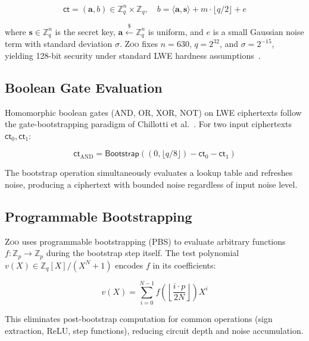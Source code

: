 \documentclass[11pt,letterpaper]{article}
\theoremstyle{definition}
\theoremstyle{remark}
\newcommand{\Zoo}{\textsc{Zoo}}
\newcommand{\LWE}{\textsc{LWE}}
\begin{document}
\begin{equation}
  \mathsf{ct} = (\mathbf{a}, b) \in \mathbb{Z}_q^n \times \mathbb{Z}_q, \quad b = \langle \mathbf{a}, \mathbf{s} \rangle + m \cdot \lfloor q/2 \rfloor + e
\end{equation}

\noindent where $\mathbf{s} \in \mathbb{Z}_q^n$ is the secret key, $\mathbf{a} \xleftarrow{\$} \mathbb{Z}_q^n$ is uniform, and $e$ is a small Gaussian noise term with standard deviation $\sigma$. \Zoo{} fixes $n = 630$, $q = 2^{32}$, and $\sigma = 2^{-15}$, yielding 128-bit security under standard \LWE{} hardness assumptions~\cite{albrecht2015lwe}.

\subsection{Boolean Gate Evaluation}

Homomorphic boolean gates (AND, OR, XOR, NOT) on \LWE{} ciphertexts follow the gate-bootstrapping paradigm of Chillotti et al.~\cite{chillotti2020tfhe}. For two input ciphertexts $\mathsf{ct}_0, \mathsf{ct}_1$:

\begin{equation}
  \mathsf{ct}_{\mathrm{AND}} = \mathsf{Bootstrap}\!\left( (0, \lfloor q/8 \rfloor) - \mathsf{ct}_0 - \mathsf{ct}_1 \right)
\end{equation}

The bootstrap operation simultaneously evaluates a lookup table and refreshes noise, producing a ciphertext with bounded noise regardless of input noise level.

\subsection{Programmable Bootstrapping}

\Zoo{} uses programmable bootstrapping (PBS) to evaluate arbitrary functions $f: \mathbb{Z}_p \to \mathbb{Z}_p$ during the bootstrap step itself. The test polynomial $v(X) \in \mathbb{Z}_q[X]/(X^N+1)$ encodes $f$ in its coefficients:

\begin{equation}
  v(X) = \sum_{i=0}^{N-1} f\!\left(\left\lfloor \frac{i \cdot p}{2N} \right\rfloor\right) X^i
\end{equation}

This eliminates post-bootstrap computation for common operations (sign extraction, ReLU, step functions), reducing circuit depth and noise accumulation.
\end{document}

